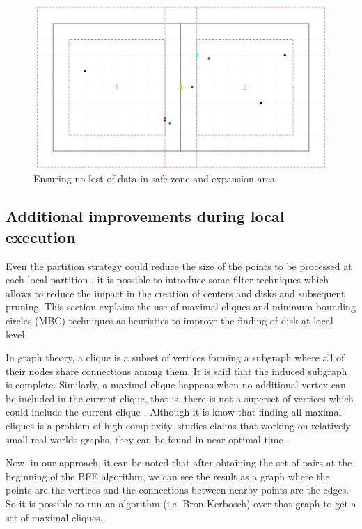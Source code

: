 \begin{itemize}
\begin{figure}
    \centering
    \includegraphics[width=\linewidth, page=3]{figures/merge}
    \caption{Ensuring no lost of data in safe zone and expansion area.}\label{fig:ensuring}
\end{figure}

\subsection{Additional improvements during local execution}
Even the partition strategy could reduce the size of the points to be processed at each local partition , it is possible to introduce some filter techniques which allows to reduce the impact in the creation of centers and disks and subsequent pruning.  This section explains the use of maximal cliques and minimum bounding circles (MBC) techniques as heuristics to improve the finding of disk at local level.

In graph theory, a clique is a subset of vertices forming a subgraph where all of their nodes share connections among them.  It is said that the induced subgraph is complete.  Similarly, a maximal clique happens when no additional vertex can be included in the current clique, that is, there is not a superset of vertices which could include the current clique \cite{bron_algorithm_1973}.  Although it is know that finding all maximal cliques is a problem of high complexity, studies claims that working on relatively small real-worlds graphs, they can be found in near-optimal time \cite{eppstein_listing_2010}.

Now, in our approach, it can be noted that after obtaining the set of pairs at the beginning of the BFE algorithm, we can see the result as a graph where the points are the vertices and the connections between nearby points are the edges.  So it is possible to run an algorithm (i.e. Bron-Kerbosch) over that graph to get a set of maximal cliques.


\end{itemize}
